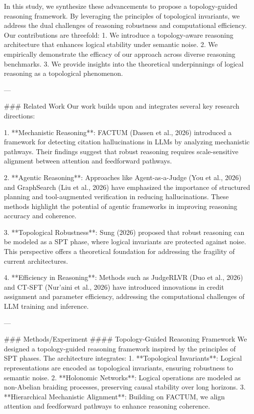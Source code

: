 In this study, we synthesize these advancements to propose a topology-guided reasoning framework. By leveraging the principles of topological invariants, we address the dual challenges of reasoning robustness and computational efficiency. Our contributions are threefold:
1. We introduce a topology-aware reasoning architecture that enhances logical stability under semantic noise.
2. We empirically demonstrate the efficacy of our approach across diverse reasoning benchmarks.
3. We provide insights into the theoretical underpinnings of logical reasoning as a topological phenomenon.

---

### Related Work
Our work builds upon and integrates several key research directions:

1. **Mechanistic Reasoning**: FACTUM (Dassen et al., 2026) introduced a framework for detecting citation hallucinations in LLMs by analyzing mechanistic pathways. Their findings suggest that robust reasoning requires scale-sensitive alignment between attention and feedforward pathways.

2. **Agentic Reasoning**: Approaches like Agent-as-a-Judge (You et al., 2026) and GraphSearch (Liu et al., 2026) have emphasized the importance of structured planning and tool-augmented verification in reducing hallucinations. These methods highlight the potential of agentic frameworks in improving reasoning accuracy and coherence.

3. **Topological Robustness**: Sung (2026) proposed that robust reasoning can be modeled as a SPT phase, where logical invariants are protected against noise. This perspective offers a theoretical foundation for addressing the fragility of current architectures.

4. **Efficiency in Reasoning**: Methods such as JudgeRLVR (Duo et al., 2026) and CT-SFT (Nur’aini et al., 2026) have introduced innovations in credit assignment and parameter efficiency, addressing the computational challenges of LLM training and inference.

---

### Methods/Experiment
#### Topology-Guided Reasoning Framework
We designed a topology-guided reasoning framework inspired by the principles of SPT phases. The architecture integrates:
1. **Topological Invariants**: Logical representations are encoded as topological invariants, ensuring robustness to semantic noise.
2. **Holonomic Networks**: Logical operations are modeled as non-Abelian braiding processes, preserving causal stability over long horizons.
3. **Hierarchical Mechanistic Alignment**: Building on FACTUM, we align attention and feedforward pathways to enhance reasoning coherence.

